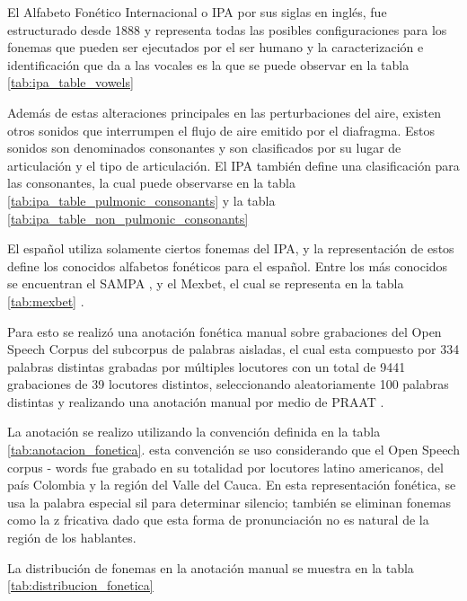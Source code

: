 \documentclass[a4paper,12pt,twoside]{report}
\begin{document}
El Alfabeto Fonético Internacional o IPA por sus siglas en inglés, fue estructurado desde 1888 y representa todas las posibles configuraciones para los fonemas que pueden ser ejecutados por el ser humano y la caracterización e identificación que da a las vocales es la que se puede observar en la tabla \ref{tab:ipa_table_vowels}




Además de estas alteraciones principales en las perturbaciones del aire, existen otros sonidos que interrumpen el flujo de aire emitido por el diafragma. Estos sonidos son denominados consonantes y son clasificados por su lugar de articulación y el tipo de articulación. El IPA también define una clasificación para las consonantes, la cual puede observarse en la tabla \ref{tab:ipa_table_pulmonic_consonants} y la tabla \ref{tab:ipa_table_non_pulmonic_consonants}





El español utiliza solamente ciertos fonemas del IPA, y la representación de estos define los conocidos alfabetos fonéticos para el español. Entre los más conocidos se encuentran el SAMPA \cite{SAMPA}, y el Mexbet, el cual se representa en la tabla \ref{tab:mexbet} \cite{mexbet}.



Para esto se realizó una anotación fonética manual sobre grabaciones del Open Speech Corpus \cite{Collazos2015} del subcorpus de palabras aisladas, el cual esta compuesto por 334 palabras distintas grabadas por múltiples locutores con un total de 9441 grabaciones de 39 locutores distintos, seleccionando aleatoriamente 100 palabras distintas y realizando una anotación manual por medio de PRAAT \cite{Praat}.

La anotación se realizo utilizando la convención definida en la tabla \ref{tab:anotacion_fonetica}. esta convención se uso considerando que el Open Speech corpus - words fue grabado en su totalidad por locutores latino americanos, del país Colombia y la región del Valle del Cauca. En esta representación fonética, se usa la palabra especial sil para determinar silencio; también se eliminan fonemas como la z fricativa dado que esta forma de pronunciación no es natural de la región de los hablantes.




La distribución de fonemas en la anotación manual se muestra en la tabla \ref{tab:distribucion_fonetica}
\end{document}
